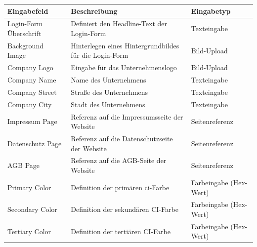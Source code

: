 \documentclass[
	ngerman,
	BCOR=8mm,
	headings=normal,
	parskip=half,
	headsepline,
	automark,
	listof=totoc,
	bibliography=totoc,
]{scrreprt}
\begin{document}
%

\cleardoublepage
{}


\cleardoublepage
{}
\tableofcontents
\listoftables
\listoffigures
\printglossary
\printglossary[type=\acronymtype, title={Abkürzungsverzeichnis}]
\printglossary[type=symbols, title={Symbolverzeichnis}]
%
\cleardoublepage
{}





%
\printbibliography[prenote=mynote]
%
\appendix
{}
\begin{table}[h]
    \centering
    \renewcommand{\arraystretch}{1.3}
    \begin{tabular}{|p{3cm}|p{6cm}|p{5cm}|}
        \hline
        \textbf{Eingabefeld} & \textbf{Beschreibung} & \textbf{Eingabetyp} \\
        \hline
        Login-Form Überschrift & Definiert den Headline-Text der Login-Form & Texteingabe \\
        \hline
        Background Image & Hinterlegen eines Hintergrundbildes für die Login-Form & Bild-Upload \\
        \hline
        Company Logo & Eingabe für das Unternehmenslogo & Bild-Upload \\
        \hline
        Company Name & Name des Unternehmens & Texteingabe \\
        \hline
        Company Street & Straße des Unternehmens & Texteingabe \\
        \hline
        Company City & Stadt des Unternehmens & Texteingabe \\
        \hline
        Impressum Page & Referenz auf die Impressumsseite der Website & Seitenreferenz \\
        \hline
        Datenschutz Page & Referenz auf die Datenschutzseite der Website & Seitenreferenz \\
        \hline
        AGB Page & Referenz auf die AGB-Seite der Website & Seitenreferenz \\
        \hline
        Primary Color & Definition der primären \gls{ci}-Farbe & Farbeingabe (Hex-Wert) \\
        \hline
        Secondary Color & Definition der sekundären CI-Farbe & Farbeingabe (Hex-Wert) \\
        \hline
        Tertiary Color & Definition der tertiären CI-Farbe & Farbeingabe (Hex-Wert) \\

\end{tabular}
\end{table}
\end{document}
